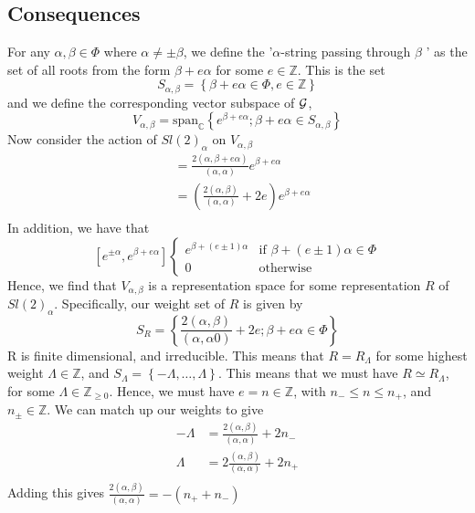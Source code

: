 \subsection{Consequences} 
For any $ \alpha , \beta \in \Phi  $ where  $ \alpha \neq \pm  \beta $, 
we define the '$ \alpha $-string passing through $ \beta $ ' 
as the set of all 
roots from the form $ \beta + e \alpha $ for some
$ e \in \mathbb{ Z} $. This is the set 
\[
	S_{ \alpha, \beta } = \left\{  \beta + e \alpha  \in \Phi , e \in \mathbb{ Z}  \right\} 
\] and we define the corresponding vector subspace of $ \mathcal{ G } $, 
\[
	V _{ \alpha, \beta } = \text{span} _{ \mathbb{ C} } \left\{  
	e ^{ \beta + e \alpha} ; \beta + e \alpha \in S_{ \alpha , \beta }\right\} 
\] 
Now consider the action of $ Sl ( 2) _{ \alpha } $ on 
$ V_{ \alpha, \beta } $ 
\begin{align*}
	[ h ^ \alpha, e ^{ \beta + e \alpha } ] &=  \frac{ 2 ( \alpha, \beta + e \alpha ) }{ 
	\left(  \alpha, \alpha  \right)  } e ^{ \beta + e \alpha }  \\
						&=  \left(  \frac{2 ( \alpha , \beta ) }{ ( \alpha, \alpha ) } 
						+ 2 e \right)  e ^{ \beta + e \alpha }  \\
\end{align*}
In addition, we have that 
\[
	[ e ^{ \pm \alpha } , e ^{ \beta + e \alpha} ] \begin{cases}
		e ^{ \beta + ( e \pm 1 ) \alpha } & \text{if } \beta + ( e \pm 1 ) \alpha \in \Phi \\
		0 & \text{otherwise}
	\end{cases}
\]  
Hence, we find that $ V_{ \alpha, \beta } $ is a representation 
space for some representation $ R $ of $ Sl ( 2 )_ \alpha $. 
Specifically, our weight set of $ R $  is given by 
\[
	S_{ R }  = \left\{  \frac{2 ( \alpha, \beta ) }{ ( \alpha, \alpha 0 ) } +  2 e ; 
	\beta + e \alpha \in \Phi \right\} 
\] R is finite dimensional, and irreducible.
This means that $ R  =R _{ \Lambda } $ for 
some highest weight $ \Lambda \in \mathbb{ Z} $, and 
$ S _{ \Lambda }  = \left\{   - \Lambda , \dots, \Lambda  \right\}  $. 
This means that we must have $ R \simeq R_{\Lambda } $,
for some $ \Lambda \in \mathbb{ Z} _{ \geq 0  } $. 
Hence, we must have $ e = n \in \mathbb{ Z} $, with 
$ n _ - \leq n \leq n _ + $, and $ n_{ \pm } \in \mathbb{ Z} $. 
We can match up our weights to give 
\begin{align*}
	- \Lambda &  = \frac{ 2 ( \alpha , \beta ) }{ ( \alpha, \alpha ) } + 2 n_ - \\
	\Lambda &=   2 \frac{ ( \alpha, \beta ) }{ ( \alpha, \alpha )   } + 2 n _ +   \\
\end{align*}
Adding this gives $ \frac{ 2 ( \alpha , \beta ) }{ ( \alpha , \alpha ) }  = - ( n _ + + n _ - ) $
\pagebreak 
